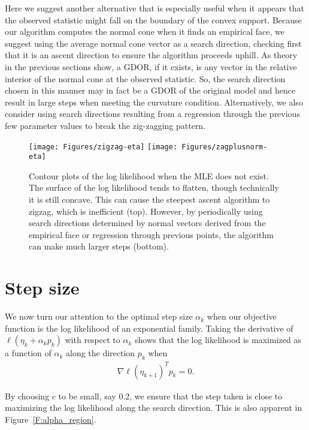 Here we suggest another alternative that is especially useful when it appears that the 
observed statistic might fall on the boundary of the convex support.  Because our 
algorithm computes the normal cone when it finds an empirical face, we suggest using 
the average normal cone vector as a search direction, checking first that it is an 
ascent direction to ensure the algorithm proceeds uphill.  As theory in the previous 
sections show, a GDOR, if it exists, is any vector in the relative interior of the 
normal cone at the observed statistic.  So, the search direction chosen in this manner 
may in fact be a GDOR of the original model and hence result in large steps when 
meeting the curvature condition.  Alternatively, we also consider using search 
directions resulting from a regression through the previous few parameter values to 
break the zig-zagging pattern.

\begin{figure}[!ht]
\centering
\texttt{[image: Figures/zigzag-eta]}
\texttt{[image: Figures/zagplusnorm-eta]}
\caption{Contour plots of the log likelihood when the MLE does not exist.  The surface 
of the log 
likelihood tends to flatten, though technically it is still concave.  This can cause 
the steepest ascent 
algorithm to zigzag, which is inefficient (top).  However, by periodically using 
search directions 
determined by normal vectors  derived from the empirical face or regression through 
previous points, the algorithm can make much larger steps (bottom).}
\label{F:zigzag}
\end{figure}


\section{Step size}
We now turn our attention to the optimal step size $\alpha_k$ when our objective 
function is the log likelihood of an 
exponential family.  Taking the derivative of $\ell( \eta_k + \alpha_k p_k)$ with 
respect to $\alpha_k$ shows that the 
log likelihood is maximized as a function of $\alpha_k$ along the direction $p_k$  
when 
\begin{align*}
	\nabla \ell( \eta_{k+1} )^T p_k = 0.
\end{align*}

By choosing $c$ to be small, say 0.2, we ensure that the step taken is close to 
maximizing the log likelihood along the 
search direction.  This is also apparent in Figure~\ref{F:alpha_region}. 


